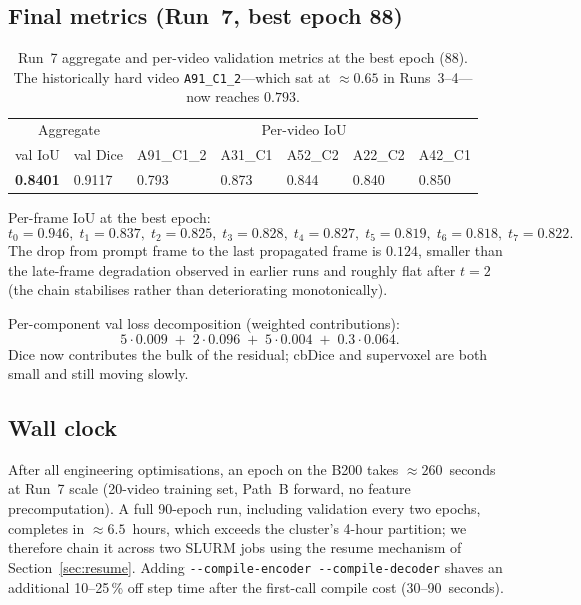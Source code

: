 \documentclass[11pt,a4paper]{article}
\begin{document}
\subsection{Final metrics (Run~7, best epoch 88)}

\begin{table}[ht!]
\centering
\small
\begin{tabular}{ll|lllll}
\toprule
\multicolumn{2}{c|}{Aggregate} & \multicolumn{5}{c}{Per-video IoU} \\
val IoU & val Dice & A91\_C1\_2 & A31\_C1 & A52\_C2 & A22\_C2 & A42\_C1 \\
\midrule
\textbf{0.8401} & 0.9117 & 0.793 & 0.873 & 0.844 & 0.840 & 0.850 \\
\bottomrule
\end{tabular}
\caption{Run~7 aggregate and per-video validation metrics at the best
epoch (88). The historically hard video \texttt{A91\_C1\_2}---which
sat at $\approx 0.65$ in Runs~3--4---now reaches $0.793$.}
\end{table}

Per-frame IoU at the best epoch:
\[
t_0{=}0.946,\;
t_1{=}0.837,\;
t_2{=}0.825,\;
t_3{=}0.828,\;
t_4{=}0.827,\;
t_5{=}0.819,\;
t_6{=}0.818,\;
t_7{=}0.822.
\]
The drop from prompt frame to the last propagated frame is $0.124$,
smaller than the late-frame degradation observed in earlier runs and
roughly flat after $t{=}2$ (the chain stabilises rather than
deteriorating monotonically).

Per-component val loss decomposition (weighted contributions):
\[
5 \cdot 0.009 \;+\; 2 \cdot 0.096 \;+\; 5 \cdot 0.004 \;+\; 0.3 \cdot 0.064.
\]
Dice now contributes the bulk of the residual; cbDice and supervoxel
are both small and still moving slowly.

\subsection{Wall clock}

After all engineering optimisations, an epoch on the B200 takes
$\approx 260$~seconds at Run~7 scale (20-video training set, Path~B
forward, no feature precomputation). A full 90-epoch run, including
validation every two epochs, completes in $\approx 6.5$~hours, which
exceeds the cluster's 4-hour partition; we therefore chain it across
two SLURM jobs using the resume mechanism of
Section~\ref{sec:resume}. Adding
\texttt{-{}-compile-encoder -{}-compile-decoder} shaves an additional
10--25\,\% off step time after the first-call compile cost
(30--90~seconds).
\end{document}
